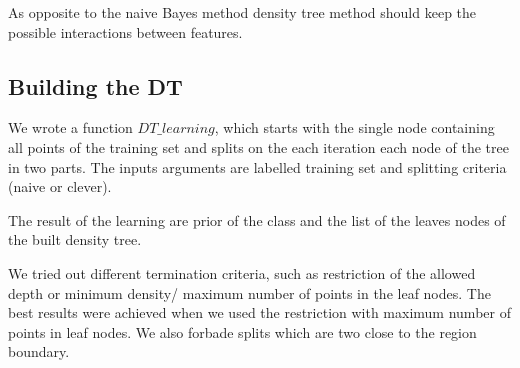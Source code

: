 \documentclass{article}
\begin{document}
As opposite to the naive Bayes method density tree method should keep the possible interactions between features.

\subsection{Building the DT}
We wrote a function $DT\_learning$, which starts with the single node containing all points of the training set and splits on the each iteration each node of the tree in two parts. The inputs arguments are labelled training set and splitting criteria (naive or clever).

The result of the learning are prior of the class and the list of the leaves nodes of the built density tree.

We tried out different termination criteria, such as restriction of the allowed depth or minimum density/ maximum number of points in the leaf nodes. The best results were achieved when we used the restriction with maximum number of points in leaf nodes. We also forbade splits which are two close to the region boundary. 
\end{document}
